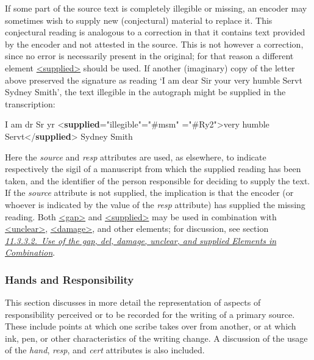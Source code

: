 If some part of the source text is completely illegible or missing, an encoder may sometimes wish to supply new (conjectural) material to replace it. This conjectural reading is analogous to a correction in that it contains text provided by the encoder and not attested in the source. This is not however a correction, since no error is necessarily present in the original; for that reason a different element \hyperref[TEI.supplied]{<supplied>} should be used. If another (imaginary) copy of the letter above preserved the signature as reading ‘I am dear Sir your very humble Servt Sydney Smith’, the text illegible in the autograph might be supplied in the transcription: \par\bgroup{}\exampleFont \begin{shaded}\noindent\mbox{}I am dr Sr yr\mbox{}\newline 
{<\textbf{supplied}\hspace*{1em}{reason}="{illegible}"\hspace*{1em}{resp}="{\#msm}"\mbox{}\newline 
\hspace*{1em}{source}="{\#Ry2}">}very humble\mbox{}\newline 
 Servt{</\textbf{supplied}>} Sydney Smith\end{shaded}\egroup\par \noindent  Here the {\itshape source} and {\itshape resp} attributes are used, as elsewhere, to indicate respectively the sigil of a manuscript from which the supplied reading has been taken, and the identifier of the person responsible for deciding to supply the text. If the {\itshape source} attribute is not supplied, the implication is that the encoder (or whoever is indicated by the value of the {\itshape resp} attribute) has supplied the missing reading. Both \hyperref[TEI.gap]{<gap>} and \hyperref[TEI.supplied]{<supplied>} may be used in combination with \hyperref[TEI.unclear]{<unclear>}, \hyperref[TEI.damage]{<damage>}, and other elements; for discussion, see section \textit{\hyperref[PHCOMB]{11.3.3.2.\ Use of the gap, del, damage, unclear, and supplied Elements in Combination}}.
\subsubsection[{Hands and Responsibility}]{Hands and Responsibility}\label{PHPH}\par
This section discusses in more detail the representation of aspects of responsibility perceived or to be recorded for the writing of a primary source. These include points at which one scribe takes over from another, or at which ink, pen, or other characteristics of the writing change. A discussion of the usage of the {\itshape hand}, {\itshape resp}, and {\itshape cert} attributes is also included.
